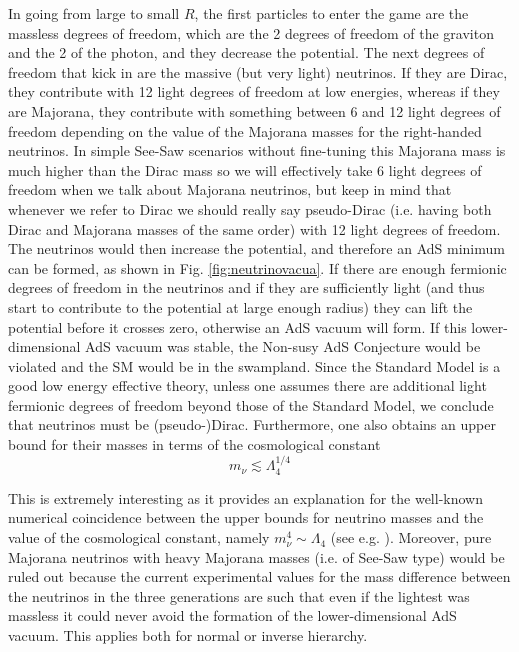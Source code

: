 \documentclass[11pt,a4paper]{article}
\begin{document}
In going from large to small $R$, the first particles to enter the game are the massless degrees of freedom, which are the 2 degrees of freedom of the graviton and the 2 of the photon, and they decrease the potential. The next degrees of freedom that kick in are the massive (but very light) neutrinos. If they are Dirac, they contribute with 12 light degrees of freedom at low energies, whereas if they are Majorana, they contribute with something between 6 and 12 light degrees of freedom depending on the value of the Majorana masses for the right-handed neutrinos. In simple See-Saw scenarios without fine-tuning this Majorana mass is much higher than the Dirac mass so we will effectively take 6 light degrees of freedom when we talk about Majorana neutrinos, but keep in mind that whenever we refer to Dirac we should really say \mbox{pseudo-Dirac} (i.e. having both Dirac and Majorana masses of the same order) with 12 light degrees of freedom. The neutrinos would then increase the potential, and therefore an AdS minimum can be formed, as shown in Fig. \ref{fig:neutrinovacua}. If there are enough fermionic degrees of freedom in the neutrinos and if they are sufficiently light (and thus start to contribute to the potential at large enough radius) they can lift the potential before it crosses zero, otherwise an AdS vacuum will form. If this lower-dimensional AdS vacuum was stable, the Non-susy AdS Conjecture would be violated and the SM would be in the swampland. Since the Standard Model is a good low energy effective theory, unless one assumes there are additional light fermionic degrees of freedom beyond those of the Standard Model, we conclude that neutrinos must be \mbox{(pseudo-)Dirac}. Furthermore, one also obtains an upper bound for their masses in terms of the cosmological constant
\begin{equation}
\label{eq:neutrinobound}
m_{\nu}\lesssim \Lambda_{4}^{1/4}  %
\end{equation}

This is extremely interesting as it provides an explanation for the well-known numerical coincidence between the upper bounds for neutrino masses and the value of the cosmological constant, namely $m_{\nu}^4 \sim \Lambda_{4} $ (see e.g. \cite{Planck2018, PDG2020}). Moreover, pure Majorana neutrinos with heavy Majorana masses (i.e. of See-Saw type) would be ruled out because the current experimental values for the mass difference between the neutrinos in the three generations are such that even if the lightest was massless it could never avoid the formation of the lower-dimensional AdS vacuum. This applies both for normal or inverse hierarchy.
\end{document}
